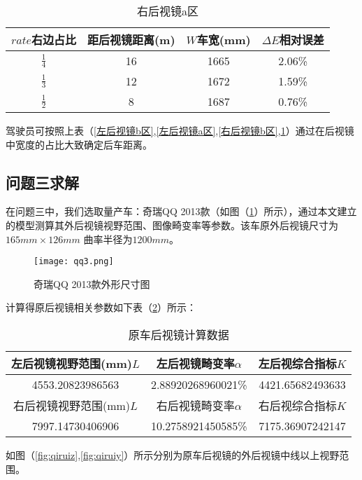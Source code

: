 \documentclass[bwprint]{cumcmthesis}
\begin{document}
\begin{table}[!htbp]
\centering
\caption{右后视镜a区}
\label{右后视镜a区}
\begin{tabular}{cccc}
\toprule
$rate$右边占比 & 距后视镜距离(m) & $W$车宽(mm) & $\Delta E$相对误差  \\ \midrule
$\frac{1}{4}$ & 16 & 1665 & 2.06\% \\
$\frac{1}{3}$ & 12 & 1672 & 1.59\% \\
$\frac{1}{2}$ & 8 & 1687 & 0.76\% \\
\bottomrule 
\end{tabular}
\end{table}

\par 驾驶员可按照上表（\ref{左后视镜b区},\ref{左后视镜a区},\ref{右后视镜b区},\ref{右后视镜a区}）通过在后视镜中宽度的占比大致确定后车距离。

\subsection{问题三求解}
\par 在问题三中，我们选取量产车：奇瑞QQ 2013款（如图（\ref{fig:qq3}）所示），通过本文建立的模型测算其外后视镜视野范围、图像畸变率等参数。该车原外后视镜尺寸为$165mm \times 126mm$ 曲率半径为$1200mm$。
\begin{figure}[h]
\small
\centering
\texttt{[image: qq3.png]}
\caption{奇瑞QQ 2013款外形尺寸图} \label{fig:qq3}
\end{figure}

计算得原后视镜相关参数如下表（\ref{原车后视镜计算数据}）所示：
\begin{table}[!htbp]
\centering
\caption{原车后视镜计算数据}
\label{原车后视镜计算数据}
\begin{tabular}{|c|c|c|}
\toprule
左后视镜视野范围(mm)$L$ & 左后视镜畸变率$\alpha$ & 左后视综合指标$K$ \\ \hline 
4553.20823986563 & 2.88920268960021\%  & 4421.65682493633 \\ \hline 


右后视镜视野范围(mm)$L$ & 右后视镜畸变率$\alpha$  & 右后视综合指标$K$ \\ \hline
7997.14730406906 & 10.2758921450585\%  &  7175.36907242147 \\

\bottomrule 
\end{tabular}

\end{table}
\par 如图（\ref{fig:qiruiz},\ref{fig:qiruiy}）所示分别为原车后视镜的外后视镜中线以上视野范围。
\end{document}

